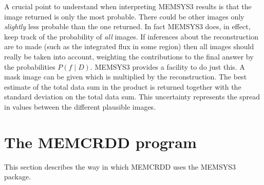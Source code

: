 A crucial point to understand when interpreting MEMSYS3 results is that the
image returned is only the most probable. There could be other images only
{\em slightly} less probable than the one returned. In fact MEMSYS3 does, in
effect, keep track of the probability of {\em all} images. If inferences about
the reconstruction are to made (such as the integrated flux in some region)
then all images should really be taken into account, weighting the
contributions to the final answer by the probabilities $P( f \mid D)$. MEMSYS3
provides a facility to do just this. A mask image can be given which is
multiplied by the reconstruction. The best estimate of the total data sum in
the product is returned together with the standard deviation on the total data
sum. This uncertainty represents the spread in values between the different
plausible images.

\section {The MEMCRDD program}
This section describes the way in which MEMCRDD uses the MEMSYS3 package.


